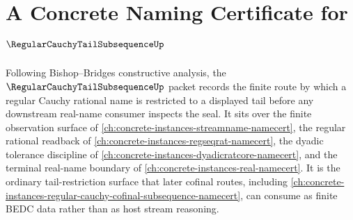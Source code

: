 \chapter{A Concrete Naming Certificate for $\RegularCauchyTailSubsequenceUp$}
\label{ch:concrete-instances-regular-cauchy-tail-subsequence-namecert}

Following Bishop--Bridges constructive analysis, the $\RegularCauchyTailSubsequenceUp$ packet records the finite route by which a regular Cauchy rational name is restricted to a displayed tail before any downstream real-name consumer inspects the seal. It sits over the finite observation surface of \autoref{ch:concrete-instances-streamname-namecert}, the regular rational readback of \autoref{ch:concrete-instances-regseqrat-namecert}, the dyadic tolerance discipline of \autoref{ch:concrete-instances-dyadicratcore-namecert}, and the terminal real-name boundary of \autoref{ch:concrete-instances-real-namecert}. It is the ordinary tail-restriction surface that later cofinal routes, including \autoref{ch:concrete-instances-regular-cauchy-cofinal-subsequence-namecert}, can consume as finite BEDC data rather than as host stream reasoning.

